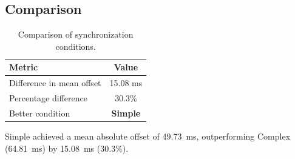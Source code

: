 \subsection*{Comparison}

\begin{table}[h!]
\centering
\begin{tabular}{|l|c|}
\hline
Metric & Value \\
\hline
Difference in mean offset & 15.08 ms \\
Percentage difference & 30.3\% \\
Better condition & \textbf{Simple} \\
\hline
\end{tabular}
\caption{Comparison of synchronization conditions.}
\label{tab:sync_comparison}
\end{table}

Simple achieved a mean absolute offset of 49.73~ms, outperforming Complex (64.81~ms) by 15.08~ms (30.3\%).
